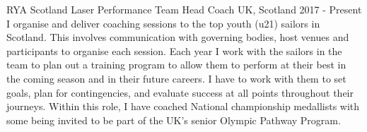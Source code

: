   \cventry
    {RYA Scotland} %
    {Laser Performance Team Head Coach} %
    {UK, Scotland} %
    {2017 - Present} %
    {
        I organise and deliver coaching sessions to the top youth (u21) 
        sailors in Scotland. This involves communication with governing bodies,
        host venues and participants to organise each session. Each year I 
        work with the sailors in the team to plan out a training program to 
        allow them to perform at their best in the coming season and in their future 
        careers. I have to work with them to set goals, plan for contingencies,
        and evaluate success at all points throughout their journeys.
        Within this role, I have coached National championship 
        medallists with some being invited to be part 
        of the UK's senior Olympic Pathway Program.\newline
     }
